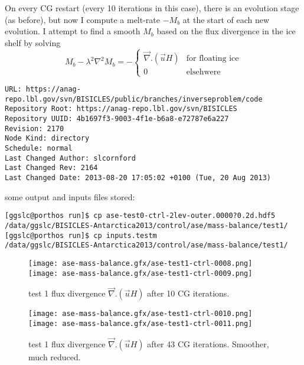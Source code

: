 \documentclass{article}
\begin{document}
On every CG restart (every 10 iterations in this case), there is an evolution stage (as before), but now I compute
a melt-rate $-M_b$ at the start of each new evolution. I attempt to find a smooth $M_b$ based on the flux divergence
in the ice shelf by solving 
\begin{equation}
  M_b - \lambda^2 \nabla ^2 M_b = - \left \{ 
  \begin{array}{lr} 
    \vec{\nabla}. (\vec{u} H) & \mbox{for floating ice} \\
    0 & \mbox{elsehwere}
  \end{array} \right. 
\end{equation}

\begin{verbatim}
URL: https://anag-repo.lbl.gov/svn/BISICLES/public/branches/inverseproblem/code
Repository Root: https://anag-repo.lbl.gov/svn/BISICLES
Repository UUID: 4b1697f3-9003-4f1e-b6a8-e72787e6a227
Revision: 2170
Node Kind: directory
Schedule: normal
Last Changed Author: slcornford
Last Changed Rev: 2164
Last Changed Date: 2013-08-20 17:05:02 +0100 (Tue, 20 Aug 2013)
\end{verbatim}

some output and inputs files stored:
\begin{verbatim}
[ggslc@porthos run]$ cp ase-test0-ctrl-2lev-outer.0000?0.2d.hdf5 
/data/ggslc/BISICLES-Antarctica2013/control/ase/mass-balance/test1/
[ggslc@porthos run]$ cp inputs.testm 
/data/ggslc/BISICLES-Antarctica2013/control/ase/mass-balance/test1/
\end{verbatim}

\begin{figure}
\begin{center}
\texttt{[image: ase-mass-balance.gfx/ase-test1-ctrl-0008.png]}
\texttt{[image: ase-mass-balance.gfx/ase-test1-ctrl-0009.png]}
\end{center}
\caption{\protect{\label{fig::test1a}}} test 1 flux divergence $\vec{\nabla}. (\vec{u} H)$
after 10 CG iterations. 
\end{figure}

\begin{figure}
\begin{center}
\texttt{[image: ase-mass-balance.gfx/ase-test1-ctrl-0010.png]}
\texttt{[image: ase-mass-balance.gfx/ase-test1-ctrl-0011.png]}
\end{center}
\caption{\protect{\label{fig::test1b}}} test 1  flux divergence $\vec{\nabla}. (\vec{u} H)$
after 43 CG iterations. Smoother, much reduced.
\end{figure}
\end{document}
